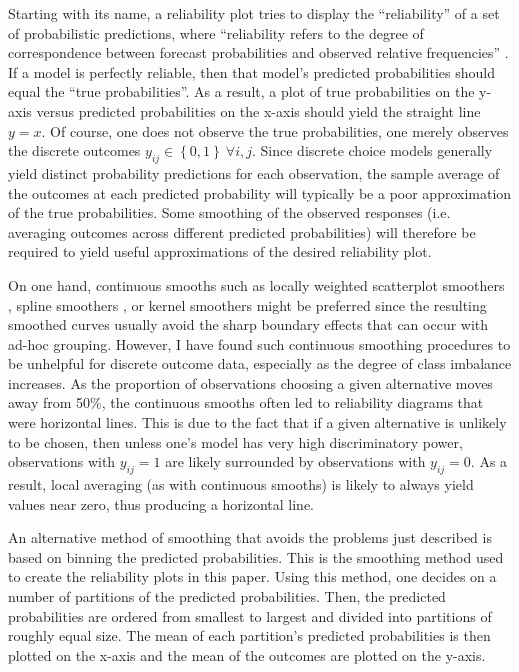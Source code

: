 \documentclass[preprint]{elsarticle}
\begin{document}
Starting with its name, a reliability plot tries to display the ``reliability'' of a set of probabilistic predictions, where ``reliability refers to the degree of correspondence between forecast probabilities and observed relative frequencies'' \citep[p.41]{murphy_reliability_1977}. If a model is perfectly reliable, then that model's predicted probabilities should equal the ``true probabilities''. As a result, a plot of true probabilities on the y-axis versus predicted probabilities on the x-axis should yield the straight line $y = x$. Of course, one does not observe the true probabilities, one merely observes the discrete outcomes $y_{ij} \in \left\lbrace 0, 1 \right\rbrace \ \forall i, j$. Since discrete choice models generally yield distinct probability predictions for each observation, the sample average of the outcomes at each predicted probability will typically be a poor approximation of the true probabilities. Some smoothing of the observed responses (i.e. averaging outcomes across different predicted probabilities) will therefore be required to yield useful approximations of the desired reliability plot.

On one hand, continuous smooths such as locally weighted scatterplot smoothers \citep{cleveland_bootstrap_1979}, spline smoothers \citep{silverman_spline_1984}, or kernel smoothers \citep{ghosh_kernel_2018} might be preferred since the resulting smoothed curves usually avoid the sharp boundary effects that can occur with ad-hoc grouping. However, I have found such continuous smoothing procedures to be unhelpful for discrete outcome data, especially as the degree of class imbalance increases. As the proportion of observations choosing a given alternative moves away from 50\%, the continuous smooths often led to reliability diagrams that were horizontal lines. This is due to the fact that if a given alternative is unlikely to be chosen, then unless one's model has very high discriminatory power, observations with $y_{ij} = 1$ are likely surrounded by observations with $y_{ij} = 0$. As a result, local averaging (as with continuous smooths) is likely to always yield values near zero, thus producing a horizontal line.

An alternative method of smoothing that avoids the problems just described is based on binning the predicted probabilities. This is the smoothing method used to create the reliability plots in this paper. Using this method, one decides on a number of partitions of the predicted probabilities. Then, the predicted probabilities are ordered from smallest to largest and divided into partitions of roughly equal size. The mean of each partition's predicted probabilities is then plotted on the x-axis and the mean of the outcomes are plotted on the y-axis.
\end{document}
